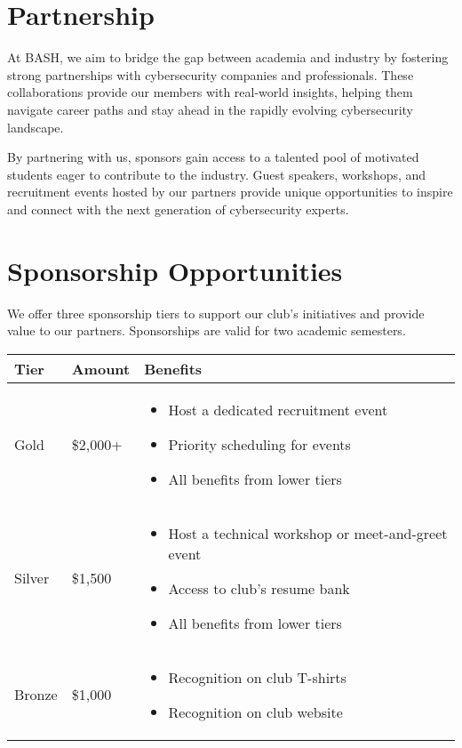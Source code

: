 \documentclass[11pt,letterpaper]{article}
\begin{document}
\section*{Partnership}
At BASH, we aim to bridge the gap between academia and industry by fostering strong partnerships with cybersecurity companies and professionals. These collaborations provide our members with real-world insights, helping them navigate career paths and stay ahead in the rapidly evolving cybersecurity landscape.

By partnering with us, sponsors gain access to a talented pool of motivated students eager to contribute to the industry. Guest speakers, workshops, and recruitment events hosted by our partners provide unique opportunities to inspire and connect with the next generation of cybersecurity experts.

\section*{Sponsorship Opportunities}
We offer three sponsorship tiers to support our club's initiatives and provide value to our partners. Sponsorships are valid for two academic semesters.

\begin{center}
    \begin{tabular}{m{2.5cm} m{2.5cm} p{8cm}}
        \toprule
        \textbf{Tier} & \textbf{Amount} & \textbf{Benefits} \\
        \midrule
        Gold & \$2,000+ & 
        \begin{itemize}[leftmargin=*,nosep,topsep=0pt,partopsep=0pt]
            \item Host a dedicated recruitment event
            \item Priority scheduling for events
            \item All benefits from lower tiers
        \end{itemize} \\
        \addlinespace %
        Silver & \$1,500 & 
        \begin{itemize}[leftmargin=*,nosep,topsep=0pt,partopsep=0pt]
            \item Host a technical workshop or meet-and-greet event
            \item Access to club's resume bank
            \item All benefits from lower tiers
        \end{itemize} \\
        \addlinespace
        Bronze & \$1,000 & 
        \begin{itemize}[leftmargin=*,nosep,topsep=0pt,partopsep=0pt]
            \item Recognition on club T-shirts
            \item Recognition on club website
        \end{itemize} \\
        \bottomrule
    \end{tabular}
\end{center}
\end{document}
